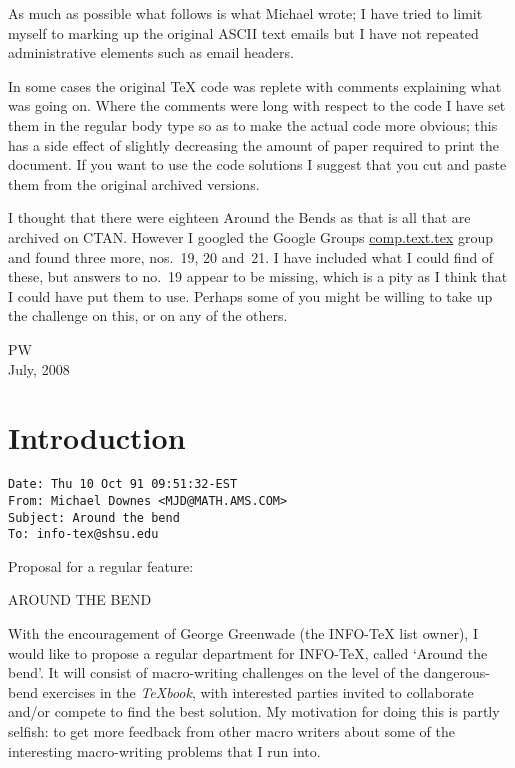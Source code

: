     As much as possible what follows is what Michael wrote; I have tried to 
limit myself to marking up the original ASCII text emails but I have not
repeated administrative elements such as email headers. 

    In some cases the 
original TeX code was replete with comments explaining what was going on.
Where the comments were long with respect to the code I have set them in
the regular body type so as to make the actual code more obvious; this has a
side effect of slightly decreasing the amount of paper required to
print the document. If you 
want to use the code solutions I suggest that you cut and paste them
from the original archived versions.

    I thought that there were eighteen Around the Bends as that is all that
are archived on CTAN. However I googled the Google Groups \url{comp.text.tex} 
group
and found three more, nos.~19, 20 and~21. I have included what I could find
of these, but answers to no.~19 appear to be missing, which is a pity as
I think that I could have put them to use. Perhaps some of you might be 
willing to take up the challenge on this, or on any of the others.

    

{\raggedleft \textsc{PW}\\ July, 2008 \par}

\chapter{Introduction}



\begin{verbatim}
Date: Thu 10 Oct 91 09:51:32-EST
From: Michael Downes <MJD@MATH.AMS.COM>
Subject: Around the bend
To: info-tex@shsu.edu
\end{verbatim}

Proposal for a regular feature:

  AROUND THE BEND

With the encouragement of George Greenwade (the INFO-TeX list owner), I
would like to propose a regular department for INFO-TeX, called `Around
the bend'. It will consist of macro-writing challenges on the level of
the dangerous-bend exercises in the \emph{TeXbook}, with interested parties
invited to collaborate and/or compete to find the best solution. My
motivation for doing this is partly selfish: to get more feedback from
other macro writers about some of the interesting macro-writing
problems that I run into.


